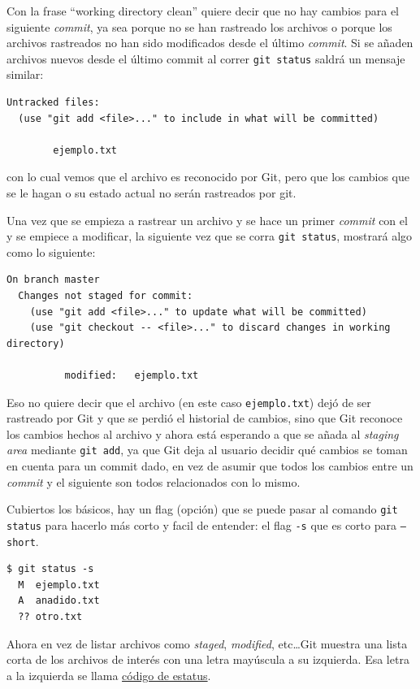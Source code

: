 \documentclass[spanish, 12pt, a4paper]{article}
\begin{document}
Con la frase ``working directory clean'' quiere decir que no hay cambios para el siguiente \textit{commit}, ya sea porque no se han rastreado los archivos o porque los archivos rastreados no han sido modificados desde el último \textit{commit}.
Si se añaden archivos nuevos desde el último commit al correr \texttt{git status} saldrá un mensaje similar:
\begin{lstlisting}
Untracked files:
  (use "git add <file>..." to include in what will be committed)

        ejemplo.txt
\end{lstlisting}
con lo cual vemos que el archivo es reconocido por Git, pero que los cambios que se le hagan o su estado actual no serán rastreados por git.

Una vez que se empieza a rastrear un archivo y se hace un primer \textit{commit} con el y se empiece a modificar, la siguiente vez que se corra \texttt{git status}, mostrará algo como lo siguiente:
\begin{lstlisting}
On branch master
  Changes not staged for commit:
    (use "git add <file>..." to update what will be committed)
    (use "git checkout -- <file>..." to discard changes in working directory)

          modified:   ejemplo.txt
\end{lstlisting}
Eso no quiere decir que el archivo (en este caso \texttt{ejemplo.txt}) dejó de ser rastreado por Git y que se perdió el historial de cambios, sino que Git reconoce los cambios hechos al archivo y ahora está esperando a que se añada al \textit{staging area} mediante \texttt{git add}, ya que Git deja al usuario decidir qué cambios se toman en cuenta para un commit dado, en vez de asumir que todos los cambios entre un \textit{commit} y el siguiente son todos relacionados con lo mismo.

Cubiertos los básicos, hay un flag (opción) que se puede pasar al comando \texttt{git status} para hacerlo más corto y facil de entender: el flag \texttt{-s} que es corto para \texttt{--short}.
\begin{lstlisting}
$ git status -s
  M  ejemplo.txt
  A  anadido.txt
  ?? otro.txt
\end{lstlisting}

Ahora en vez de listar archivos como \textit{staged}, \textit{modified}, etc\dots Git muestra una lista corta de los archivos de interés con una letra mayúscula a su izquierda.
Esa letra a la izquierda se llama \underline{código de estatus}.
\end{document}
